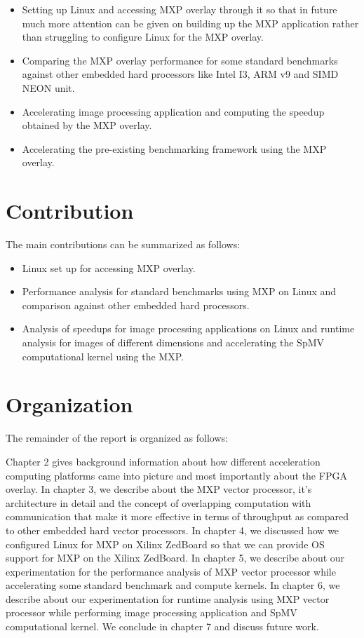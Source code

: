 \begin{itemize}
	\item Setting up Linux and accessing MXP overlay through it so that in future much more attention can be given on building up the MXP application rather than struggling to configure Linux for the MXP overlay.
	\item Comparing the MXP overlay performance for some standard benchmarks against other embedded hard processors like Intel I3, ARM v9 and SIMD NEON unit.
	\item Accelerating image processing application and computing the speedup obtained by the MXP overlay.
	\item Accelerating the pre-existing benchmarking framework using the MXP overlay.
\end{itemize}


\section{Contribution}
The main contributions can be summarized as follows:

\begin{itemize}
	\item Linux set up for accessing MXP overlay.
	\item Performance analysis for standard benchmarks using MXP on Linux and comparison against other embedded hard processors.
	\item Analysis of speedups for image processing applications on Linux and runtime analysis for images of different dimensions and accelerating the SpMV computational kernel using the MXP.
\end{itemize}

\section{Organization}
The remainder of the report is organized as follows:

Chapter 2 gives background information about how different acceleration computing platforms came into picture and most importantly about the FPGA overlay. In chapter 3, we describe about the MXP vector processor, it's architecture in detail and the concept of overlapping computation with communication that make it more effective in terms of throughput as compared to other embedded hard vector processors. In chapter 4, we discussed how we configured Linux for MXP on Xilinx ZedBoard so that we can provide OS support for MXP on the Xilinx ZedBoard. In chapter 5, we describe about our experimentation for the performance analysis of MXP vector processor while accelerating some standard benchmark and compute kernels. In chapter 6, we describe about our experimentation for runtime analysis using MXP vector processor while performing image processing application and SpMV computational kernel. We conclude in chapter 7 and discuss future work.

